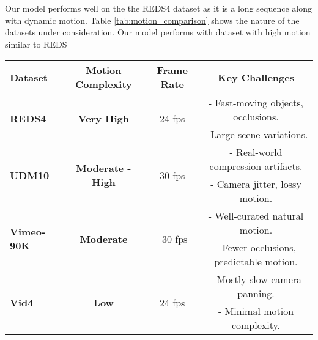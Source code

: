 \documentclass[11pt]{article}
\begin{document}
Our model performs well on the the REDS4 dataset as it is a long sequence along with dynamic motion. Table \ref{tab:motion_comparison} shows the nature of the datasets under consideration.
Our model performs with dataset with high motion similar to REDS

\begin{table*}[h]
    \centering
    \caption{Comparison of Motion Complexity Across Datasets}
    \renewcommand{\arraystretch}{0.8} %
    \setlength{\tabcolsep}{10pt} %
    \footnotesize %
    \begin{tabular}{lccc}
        \toprule
        \textbf{Dataset} & \textbf{Motion Complexity} & \textbf{Frame Rate} & \textbf{Key Challenges} \\
        \midrule
        \multirow{2}{*}{\textbf{REDS4\cite{nah2019ntire}}}  
        & \multirow{2}{*}{\textbf{Very High}} & \multirow{2}{*}{24 fps} 
        & - Fast-moving objects, occlusions. \\
        &  &  & - Large scene variations. \\
        \midrule
        
        \multirow{2}{*}{\textbf{UDM10\cite{yi2019udm10}}}  
        & \multirow{2}{*}{\textbf{Moderate - High}} & \multirow{2}{*}{30 fps} 
        & - Real-world compression artifacts. \\
        &  &  & - Camera jitter, lossy motion. \\
        \midrule
        
        \multirow{2}{*}{\textbf{Vimeo-90K\cite{xue2019video}}}  
        & \multirow{2}{*}{\textbf{Moderate}} & \multirow{2}{*}{~30 fps} 
        & - Well-curated natural motion. \\
        &  &  & - Fewer occlusions, predictable motion. \\
        \midrule
        
        \multirow{2}{*}{\textbf{Vid4\cite{liu2013bayesian}}}  
        & \multirow{2}{*}{\textbf{Low}} & \multirow{2}{*}{24 fps} 
        & - Mostly slow camera panning. \\
        &  &  & - Minimal motion complexity. \\
        \bottomrule
    \end{tabular}
    \label{tab:motion_comparison}
\end{table*}
\end{document}
